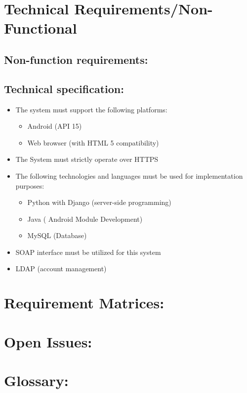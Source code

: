\documentclass[12pt]{article}
\begin{document}
	\section{Technical Requirements/Non-Functional}
	\vspace{0.2in}
	
		\subsection{Non-function requirements:}
		\vspace{0.1in}
				
		\subsection{Technical specification:} %
		\vspace{0.1in}
		
		\begin{itemize}
			\item The system must support the following platforms: 
				\begin{itemize}
					\item Android (API 15)
					\item Web browser (with HTML 5 compatibility)
				\end{itemize}
				
			\item The System must strictly operate over HTTPS
			\item The following technologies and languages must be used for implementation purposes:
				\begin{itemize}
					\item Python with Django (server-side programming)
					\item Java ( Android Module Development)
					\item MySQL (Database)
				\end{itemize}
				\item SOAP interface must be utilized for this system
				\item LDAP (account management)
		\end{itemize}
	
	\vspace{0.5in}
	
	\newpage
	\section{Requirement Matrices:}
	\vspace{0.2in}
	
	
	
	\vspace{0.5in}
	
	\section{Open Issues:}
	\vspace{0.2in}
	
	
	
	\vspace{0.5in}
	
	\section{Glossary:}
	\vspace{0.2in}
		
	
	\vspace{0.5in}
		
\end{document}
